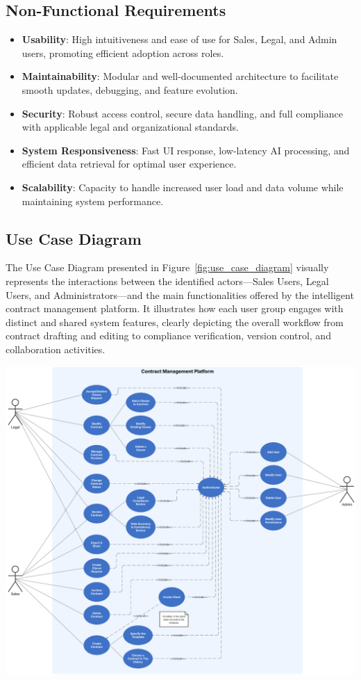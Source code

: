 \subsection{Non-Functional Requirements}
\begin{itemize}
    \item \textbf{Usability}: High intuitiveness and ease of use for Sales, Legal, and Admin users, promoting efficient adoption across roles.
    \item \textbf{Maintainability}: Modular and well-documented architecture to facilitate smooth updates, debugging, and feature evolution.
    \item \textbf{Security}: Robust access control, secure data handling, and full compliance with applicable legal and organizational standards.
    \item \textbf{System Responsiveness}: Fast UI response, low-latency AI processing, and efficient data retrieval for optimal user experience.
    \item \textbf{Scalability}: Capacity to handle increased user load and data volume while maintaining system performance.
\end{itemize}

\subsection{Use Case Diagram}
The Use Case Diagram presented in Figure~\ref{fig:use_case_diagram} visually represents the interactions between the identified actors—Sales Users, Legal Users, and Administrators—and the main functionalities offered by the intelligent contract management platform. It illustrates how each user group engages with distinct and shared system features, clearly depicting the overall workflow from contract drafting and editing to compliance verification, version control, and collaboration activities.

\begin{center}
    \centering
    \includegraphics[width=1\textwidth]{Images/Use Case Diagram.png}
    \label{fig:use_case_diagram}
\end{center}

